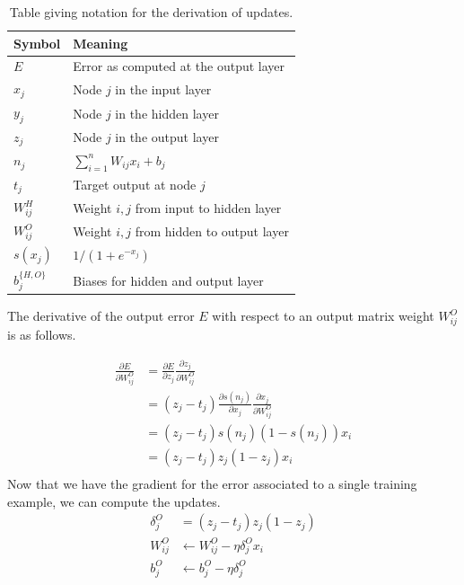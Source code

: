 \documentclass[conference]{IEEEtran}
\begin{document}
\begin{table}[h]
\normalsize
\begin{tabular}{l|l}
Symbol     & Meaning                                                          \\ \hline
$E$          & Error as computed at the output layer                            \\
$x_j$       & Node $j$ in the input layer                                      \\
$y_j$       & Node $j$ in the hidden layer                                     \\
$z_j$       & Node $j$ in the output layer                                     \\
$n_j$       & $\sum_{i=1}^n W_{ij}x_i + b_j$                                   \\
$t_j$       & Target output at node $j$                                   \\
$W_{ij}^H$ & Weight $i,j$ from input to hidden layer \\
$W_{ij}^O$ & Weight $i,j$ from hidden to output layer \\
$s(x_j)$    & $1/(1+e^{-x_j})$                                                 \\
$b_j^{\{H,O\}}$    & Biases for hidden and output layer                                                \\
\end{tabular}
\caption{Table giving notation for the derivation of updates.}
\label{tab:notation}
\end{table}

The derivative of the output error $E$ with respect to an output matrix weight $W_{ij}^O$ is as follows.

\begin{equation}
\begin{split}
\frac{\partial E}{\partial W^O_{ij}} &= \frac{\partial E}{\partial z_j}\frac{\partial z_j}{\partial W^O_{ij}} \\
																	 &=(z_j - t_j)\frac{\partial s(n_j)}{\partial x_j}\frac{\partial x_j}{\partial W^O_{ij}} \\
																	 &=(z_j-t_j)s(n_j)(1-s(n_j))x_i \\
																	 &=(z_j-t_j)z_j(1-z_j)x_i \\
\end{split}
\label{}
\end{equation}
Now that we have the gradient for the error associated to a single training example, we can compute the updates.
\begin{equation}
\begin{split}
\delta^O_j &= (z_j-t_j)z_j(1-z_j) \\
W^O_{ij} &\leftarrow W^O_{ij} - \eta \delta^O_j x_i \\
b^O_j &\leftarrow b^O_j - \eta\delta^O_j
\end{split}
\end{equation}
\end{document}
